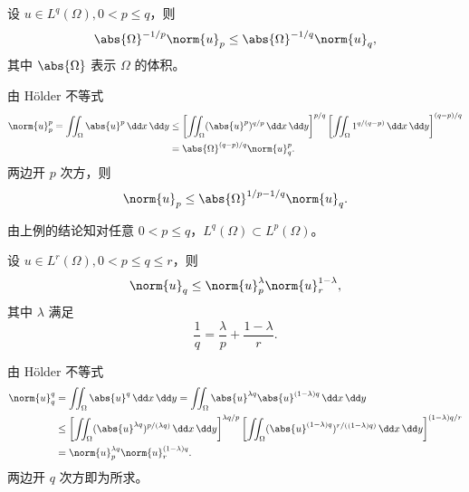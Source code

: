\begin{xexample}[22.5.8]
设 $u\in L^q(\Omega),0<p\le q$，则
\[
  \abs{\Omega}^{-1/p}\norm{u}_p\le\abs{\Omega}^{-1/q}\norm{u}_q,
\]
其中 $\abs{\Omega}$ 表示 $\Omega$ 的体积。
\end{xexample}
\begin{xproof}
由 Hölder 不等式
\begin{align*}
  \norm{u}_p^p=\iint_\Omega\abs{u}^p\,\dd x\,\dd y
  &\le\left[\iint_\Omega(\abs{u}^p)^{q/p}\,\dd x\,\dd y\right]^{p/q}
  \left[\iint_\Omega1^{q/(q-p)}\,\dd x\,\dd y\right]^{(q-p)/q}\\
  &=\abs{\Omega}^{(q-p)/q}\norm{u}_q^p.
\end{align*}
两边开 $p$ 次方，则
\[
  \norm{u}_p\le\abs{\Omega}^{1/p-1/q}\norm{u}_q.
\]
\end{xproof}

\begin{xremark}
由上例的结论知对任意 $0<p\le q$，$L^q(\Omega)\subset L^p(\Omega)$。
\end{xremark}

\begin{xexample}[22.5.9]
设 $u\in L^r(\Omega),0<p\le q\le r$，则
\[
  \norm{u}_q\le\norm{u}_p^\lambda\norm{u}_r^{1-\lambda},
\]
其中 $\lambda$ 满足
\[
  \frac1q=\frac\lambda p+\frac{1-\lambda}{r}.
\]
\end{xexample}
\begin{xproof}
由 Hölder 不等式
\begin{align*}
  \norm{u}_q^q
  &=\iint_\Omega\abs{u}^q\,\dd x\,\dd y
  =\iint_\Omega\abs{u}^{\lambda q}\abs{u}^{(1-\lambda)q}\,\dd x\,\dd y\\
  &\le\left[\iint_\Omega(\abs{u}^{\lambda q})^{p/(\lambda q)}\,\dd x\,\dd y\right]^{\lambda q/p}
  \left[\iint_\Omega(\abs{u}^{(1-\lambda)q})^{r/((1-\lambda)q)}\,\dd x\,\dd y\right]^{(1-\lambda)q/r}\\
  &=\norm{u}_p^{\lambda q}\norm{u}_r^{(1-\lambda)q}.
\end{align*}
两边开 $q$ 次方即为所求。
\end{xproof}

